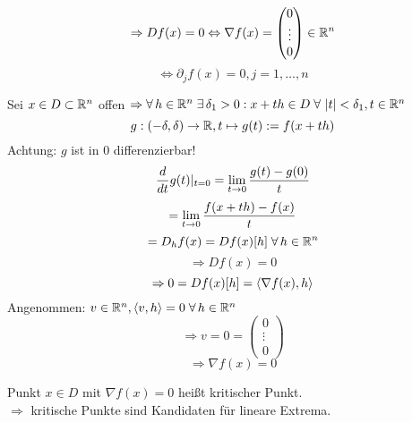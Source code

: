 \documentclass[../ana2.tex]{subfiles}
\begin{document}
\[ \Rightarrow Df(x) = 0 \Leftrightarrow \nabla f(x) = \begin{pmatrix}
    0\\
    \vdots\\
    0
\end{pmatrix} \in \mathbb{R}^n \]
\[ \Leftrightarrow \partial_jf(x) = 0, j=1,\ldots,n \]
\begin{bew}
    Sei \(x \in D \subset \mathbb{R}^n\) offen \(\Rightarrow \forall h \in \R^n \; 
    \exists \delta_1 > 0: x +th \in D \; \forall \abs{t} < \delta_1, t \in \R^n \) \\
    \[ g:(-\delta, \delta)\rightarrow \mathbb{R}, t \mapsto g(t):= f(x+th) \]
    Achtung: \(g\) ist in \(0\) differenzierbar!
    \[ \frac{d}{dt} g(t) \vert_{t=0} = \lim\limits_{t\rightarrow{}0} \frac{g(t)-g(0)}{t} \]
    \[ = \lim\limits_{t\rightarrow{}0} \frac{f(x+th)- f(x)}{t} \]
    \[ = D_hf(x) = Df(x)[h] \; \forall h \in \R^n \]
    \[ \Rightarrow Df(x) = 0 \]
    \[ \Rightarrow 0 = Df(x)[h] = \langle \nabla f(x), h \rangle \]
    Angenommen: \(v \in \R^n, \scalarprod{v}{h} = 0 \; \forall h \in \R^n\)
    \[ \Rightarrow v = 0 = \begin{pmatrix}
        0\\
        \vdots\\
        0
    \end{pmatrix} \]
    \[ \Rightarrow \nabla f(x) = 0 \]
\end{bew}
\begin{bem}
    Punkt \(x \in D\) mit \(\nabla f(x) = 0\) heißt kritischer Punkt.\\
    \( \Rightarrow \) kritische Punkte sind Kandidaten für lineare Extrema.
\end{bem}
\end{document}
